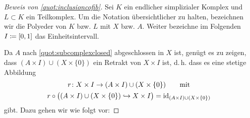 %

\begin{proof}[Beweis von \cref{quot:inclusioncofib}]
    Sei $K$ ein endlicher simplizialer Komplex und $L\subset K$ ein
    Teilkomplex. Um die Notation übersichtlicher zu halten, bezeichnen wir die
    Polyeder von $K$ bzw. $L$ mit $X$ bzw. $A$. Weiter bezeichne im Folgenden
    $I\coloneqq[0,1]$ das Einheitsintervall.

    Da $A$ nach \cref{quot:subcomplexclosed} abgeschlossen in $X$ ist, genügt es
    zu zeigen, dass $(A\times I)\cup(X\times\{0\})$ ein Retrakt von $X\times I$
    ist, d.\,h. dass es eine stetige Abbildung
    \begin{gather*}
        r\colon X\times I \to (A\times I)\cup(X\times\{0\}) 
        \qquad\text{mit} 
        \\ 
        r \circ \bigl( (A\times I)\cup(X\times\{0\}) \hookrightarrow
        X\times I \bigr) = \operatorname{id}_{(A\times I)\cup(X\times\{0\})}
    \end{gather*}
    gibt. Dazu gehen wir wie folgt vor:


\end{proof}

